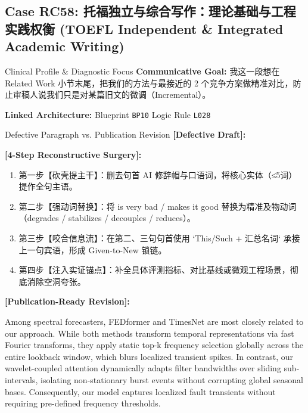 \subsection{Case RC58: 托福独立与综合写作：理论基础与工程实践权衡 (TOEFL Independent \& Integrated Academic Writing)}\label{case:RC58}
\begin{ConceptBox}{Clinical Profile \& Diagnostic Focus}
\textbf{Communicative Goal:} 我这一段想在 Related Work 小节末尾，把我们的方法与最接近的 2 个竞争方案做精准对比，防止审稿人说我们只是对某篇旧文的微调（Incremental）。\par
\textbf{Linked Architecture:} Blueprint \texttt{BP10} \enspace\textbar\enspace Logic Rule \texttt{L028}
\end{ConceptBox}
\begin{ExampleBox}{Defective Paragraph vs. Publication Revision}
\textbf{\color{TargetHighlight}[Defective Draft]:}\par
{}\par\vspace{6pt}
\textbf{\color{AcadForest}[4-Step Reconstructive Surgery]:}
\begin{enumerate}[label=\textbf{\color{AcadNavy}Step \arabic*:}, leftmargin=2em]
  \item 第一步【砍壳提主干】：删去句首 AI 修辞帽与口语词，将核心实体（≤5词）提作全句主语。
  \item 第二步【强动词替换】：将 is very bad / makes it good 替换为精准及物动词（degrades / stabilizes / decouples / reduces）。
  \item 第三步【咬合信息流】：在第二、三句句首使用 `This/Such + 汇总名词` 承接上一句宾语，形成 Given-to-New 锁链。
  \item 第四步【注入实证锚点】：补全具体评测指标、对比基线或微观工程场景，彻底消除空洞夸张。
\end{enumerate}\vspace{4pt}
\textbf{\color{AcadNavy}[Publication-Ready Revision]:}\par
Among spectral forecasters, FEDformer and TimesNet are most closely related to our approach. While both methods transform temporal representations via fast Fourier transforms, they apply static top-k frequency selection globally across the entire lookback window, which blurs localized transient spikes. In contrast, our wavelet-coupled attention dynamically adapts filter bandwidths over sliding sub-intervals, isolating non-stationary burst events without corrupting global seasonal bases. Consequently, our model captures localized fault transients without requiring pre-defined frequency thresholds.
\end{ExampleBox}
